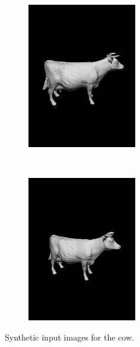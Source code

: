 \documentclass{paper}
\begin{document}
\begin{figure}[h!]
    \centering
    \begin{subfigure}[]{0.5\textwidth}
        \centering
        \includegraphics[height=2.5in]{leftCow.jpg}
    \end{subfigure}%
    ~ 
    \begin{subfigure}[]{0.5\textwidth}
        \centering
        \includegraphics[height=2.5in]{rightCow.jpg}
    \end{subfigure}
    \caption{Synthetic input images for the cow.}
\label{fig:cow}
\end{figure}
\end{document}
